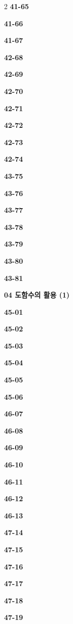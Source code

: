 \documentclass[10pt,a4paper]{article}
\begin{document}
\begin{multicols}{2}
\noindent\textbf{41-65}\ \par
\noindent\textbf{41-66}\ \par
\noindent\textbf{41-67}\ \par
\noindent\textbf{42-68}\ \par
\noindent\textbf{42-69}\ \par
\noindent\textbf{42-70}\ \par
\noindent\textbf{42-71}\ \par
\noindent\textbf{42-72}\ \par
\noindent\textbf{42-73}\ \par
\noindent\textbf{42-74}\ \par
\noindent\textbf{43-75}\ \par
\noindent\textbf{43-76}\ \par
\noindent\textbf{43-77}\ \par
\noindent\textbf{43-78}\ \par
\noindent\textbf{43-79}\ \par
\noindent\textbf{43-80}\ \par
\noindent\textbf{43-81}\ \par
\noindent\textbf{04 도함수의 활용 (1)}\par\smallskip
\noindent\textbf{45-01}\ \par
\noindent\textbf{45-02}\ \par
\noindent\textbf{45-03}\ \par
\noindent\textbf{45-04}\ \par
\noindent\textbf{45-05}\ \par
\noindent\textbf{45-06}\ \par
\noindent\textbf{46-07}\ \par
\noindent\textbf{46-08}\ \par
\noindent\textbf{46-09}\ \par
\noindent\textbf{46-10}\ \par
\noindent\textbf{46-11}\ \par
\noindent\textbf{46-12}\ \par
\noindent\textbf{46-13}\ \par
\noindent\textbf{47-14}\ \par
\noindent\textbf{47-15}\ \par
\noindent\textbf{47-16}\ \par
\noindent\textbf{47-17}\ \par
\noindent\textbf{47-18}\ \par
\noindent\textbf{47-19}\ \par

\end{multicols}
\end{document}
